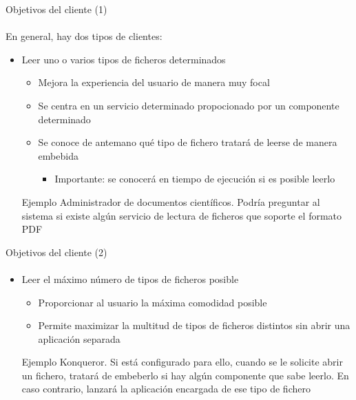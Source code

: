 \documentclass[12pt]{beamer}
\begin{document}
\begin{frame}{Objetivos del cliente (1)}
  \framesubtitle{}
  En general, hay dos tipos de clientes:
  \medskip
  \begin{itemize}
    \item Leer uno o varios tipos de ficheros determinados
    \begin{itemize}
      \item Mejora la experiencia del usuario de manera muy focal
      \item Se centra en un servicio determinado propocionado por un componente determinado
      \item Se conoce de antemano qué tipo de fichero tratará de leerse de manera embebida
      \begin{itemize}
        \item { \alert{Importante:} se conocerá en tiempo de ejecución si es posible leerlo }
      \end{itemize}
    \end{itemize}
    \smallskip
    \begin{block}{Ejemplo}
      Administrador de documentos científicos. Podría preguntar al sistema si existe algún servicio
      de lectura de ficheros que soporte el formato PDF
    \end{block}
  \end{itemize}
\end{frame}

\begin{frame}{Objetivos del cliente (2)}
  \framesubtitle{}
  \begin{itemize}
    \item Leer el máximo número de tipos de ficheros posible
      \begin{itemize}
        \item Proporcionar al usuario la máxima comodidad posible
        \item Permite maximizar la multitud de tipos de ficheros distintos sin abrir una aplicación
              separada
      \end{itemize}
      \medskip
      \begin{block}{Ejemplo}
        Konqueror. Si está configurado para ello, cuando se le solicite abrir un fichero, tratará
        de embeberlo si hay algún componente que sabe leerlo. En caso contrario, lanzará la
        aplicación encargada de ese tipo de fichero
      \end{block}
  \end{itemize}
\end{frame}
\end{document}
